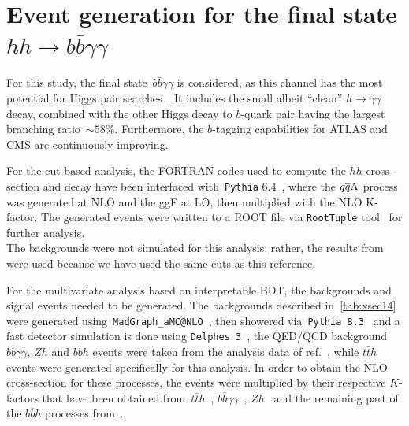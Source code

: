 \section{Event generation for the final state $ hh \to b \bar b \gamma \gamma$ \label{sec:evnt}}
For this study, the final state~$b \bar{b} \gamma \gamma$ is considered, as this channel has the most potential for Higgs pair searches~\cite{Cepeda:2019klc}. It includes the small albeit ``clean'' $h \to \gamma \gamma$ decay, combined with the other Higgs decay to $b$-quark pair having the largest branching ratio~$\sim 58\%$. Furthermore,  the $b$-tagging capabilities for ATLAS and CMS are continuously improving. \\
\par 
For the cut-based analysis, the FORTRAN codes used to compute the $hh$ cross-section and decay have been interfaced with~\texttt{Pythia} 6.4~\cite{Sjostrand:2006za}, where the $q\overline q \rm A$ process was generated at NLO and the ggF at LO, then multiplied with the NLO K-factor. The generated events were written to a ROOT file via \texttt{RootTuple} tool~\cite{roottuple} for further analysis. \\ The backgrounds were not simulated for this analysis; rather, the results from~\cite{Azatov:2015oxa} were used because we have used the same cuts as this reference.
\par 
For the multivariate analysis based on interpretable BDT, the backgrounds and signal events needed to be generated. The backgrounds described in~\autoref{tab:xsec14} were generated using~\texttt{MadGraph\_aMC@NLO}~\cite{Alwall:2014hca}, then showered via~\texttt{Pythia 8.3}~\cite{Sjostrand:2014zea} and a fast detector simulation is done using \texttt{Delphes 3}~\cite{deFavereau:2013fsa}, the QED/QCD background $ b \bar b\gamma \gamma$, $Zh$  and $ b \bar b h$ events were taken from the analysis data of ref.~\cite{Grojean:2020ech}, while $t \bar t h $ events were generated specifically for this analysis. In order to obtain the NLO cross-section for these processes, the events were multiplied by their respective $K$-factors that have been obtained from~$t\bar{t}h$~\cite{Beenakker:2001rj}, $b\bar b \gamma\gamma$~\cite{Fah:2017wlf}, $Zh$~\cite{Campanario:2014lza} and the remaining part of the $b\bar bh$ processes from~\cite{Dawson:2005vi}. \\ 
